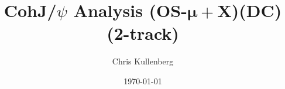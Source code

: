 \title{CohJ/$\psi$ Analysis (\textbf{OS}-$\boldsymbol{\mu+}$\textbf{X})(\textbf{DC})(\textbf{2-track})}
\author{Chris Kullenberg}
\date{\today}
